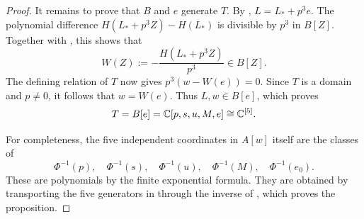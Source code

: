 \begin{proof}
It remains to prove that \(B\) and \(e\) generate \(T\).
By , \(L=L_*+p^3e\). The polynomial difference
\(H(L_*+p^3Z)-H(L_*)\) is divisible by \(p^3\) in \(B[Z]\).
Together with , this shows that
\[
 W(Z):=-\frac{H(L_*+p^3Z)}{p^3}\in B[Z].
\]
The defining relation of \(T\) now gives
\(p^3(w-W(e))=0\). Since \(T\) is a domain and \(p\ne0\), it follows
that \(w=W(e)\). Thus \(L,w\in B[e]\), which proves
\begin{equation}\label{con:polynomial-cylinder}
 T=B[e]=\mathbb C[p,s,u,M,e]\cong\mathbb C^{[5]}.
\end{equation}

For completeness, the five independent coordinates in \(A[w]\) itself
are the classes of
\[
 \Phi^{-1}(p),\quad\Phi^{-1}(s),\quad\Phi^{-1}(u),\quad
 \Phi^{-1}(M),\quad\Phi^{-1}(e_0).
\]
These are polynomials by the finite exponential formula. They are
obtained by transporting the five generators in
 through the inverse of
, which proves the proposition.
\end{proof}

